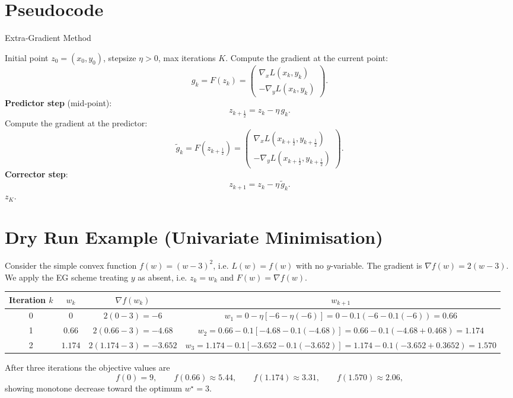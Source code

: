 \documentclass{article}
\begin{document}
\section*{Pseudocode}
\begin{algorithm}[H]
\caption{Extra‑Gradient Method}
\begin{algorithmic}[1]
\Require Initial point $z_{0}=(x_{0},y_{0})$, stepsize $\eta>0$, max iterations $K$.
    \State Compute the gradient at the current point:
    \[
    g_{k}=F(z_{k})=
    \begin{pmatrix}
    \nabla_{x}L(x_{k},y_{k})\\ -\nabla_{y}L(x_{k},y_{k})
    \end{pmatrix}.
    \]
    \State \textbf{Predictor step} (mid‑point):
    \[
    z_{k+\frac12}=z_{k}-\eta\,g_{k}.
    \]
    \State Compute the gradient at the predictor:
    \[
    \tilde g_{k}=F(z_{k+\frac12})=
    \begin{pmatrix}
    \nabla_{x}L(x_{k+\frac12},y_{k+\frac12})\\ -\nabla_{y}L(x_{k+\frac12},y_{k+\frac12})
    \end{pmatrix}.
    \]
    \State \textbf{Corrector step}:
    \[
    z_{k+1}=z_{k}-\eta\,\tilde g_{k}.
    \]
\EndFor
\State \Return $z_{K}$.
\end{algorithmic}
\end{algorithm}

\section*{Dry Run Example (Univariate Minimisation)}
Consider the simple convex function $f(w)=(w-3)^{2}$, i.e. $L(w)=f(w)$ with no $y$‑variable.  
The gradient is $\nabla f(w)=2(w-3)$.  
We apply the EG scheme treating $y$ as absent, i.e. $z_{k}=w_{k}$ and $F(w)=\nabla f(w)$.  

\begin{center}
\begin{tabular}{c|c|c|c}
Iteration $k$ & $w_{k}$ & $\nabla f(w_{k})$ & $w_{k+1}$\\\hline
0 & $0$ & $2(0-3)=-6$ & $w_{1}=0-\eta[-6-\eta(-6)]=0-0.1(-6-0.1(-6))=0.66$\\
1 & $0.66$ & $2(0.66-3)=-4.68$ & $w_{2}=0.66-0.1[-4.68-0.1(-4.68)]=0.66-0.1(-4.68+0.468)=1.174$\\
2 & $1.174$ & $2(1.174-3)=-3.652$ & $w_{3}=1.174-0.1[-3.652-0.1(-3.652)]=1.174-0.1(-3.652+0.3652)=1.570$\\
\end{tabular}
\end{center}
After three iterations the objective values are
\[
f(0)=9,\qquad f(0.66)\approx5.44,\qquad f(1.174)\approx3.31,\qquad f(1.570)\approx2.06,
\]
showing monotone decrease toward the optimum $w^{\star}=3$.
\end{document}

